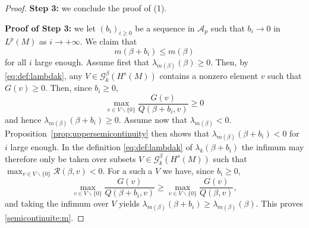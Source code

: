 \documentclass[10pt]{amsart}
\numberwithin{equation}{section}
\newcommand{\vp}{\varphi}
\theoremstyle{plain}
\theoremstyle{remark}
\begin{document}
\begin{proof}
\medskip

\textbf{Step 3:} we conclude the proof of (1). 

\medskip 

\textbf{Proof of Step 3:} we let $(b_i)_{i \ge 0}$ be a sequence in $\mathcal{A}_p$ such that $b_i \to 0$ in $L^p(M)$ as $ i \to + \infty$. We claim that 
\begin{equation} \label{semicontinuite:m}
m(\beta+ b_i) \le m(\beta)
\end{equation} 
for all $i$ large enough. Assume first that $\lambda_{m(\beta)}(\beta) \ge 0$. Then, by \eqref{eq:def:lambdak}, any $V \in \mathcal{G}_k^{\beta}(H^s(M))$ contains a nonzero element $v$ such that $G(v) \ge 0$. Then, since $b_i \ge 0$, 
$$\max_{v \in V \backslash \{0\}} \frac{G(v)}{Q(\beta + b_i, v)} \ge0$$ 
and hence $\lambda_{m(\beta)}(\beta+b_i) \ge 0$. Assume now that $\lambda_{m(\beta)} <0$. Proposition~\ref{prop:uppersemicontinuity} then shows that $\lambda_{m(\beta)}(\beta + b_i) < 0$ for $i$ large enough. In the definition \eqref{eq:def:lambdak} of $\lambda_k(\beta + b_i)$ the infimum may therefore only be taken over subsets $V \in \mathcal{G}_k^{\beta}(H^s(M))$ such that $\max_{v \in V \backslash \{0\}} \mathcal{R}(\beta, v)  <0$. For a such a $V$ we have, since $b_i \ge 0$, 
$$\max_{v \in V \backslash \{0\}} \frac{G(v)}{Q(\beta + b_i, v)} \ge \max_{v \in V \backslash \{0\}} \frac{G(v)}{Q(\beta,v)},$$
and taking the infimum over $V$ yields $\lambda_{m(\beta)}(\beta + b_i) \ge \lambda_{m(\beta)}(\beta)$. This proves \eqref{semicontinuite:m}. 

\end{proof}
\end{document}
